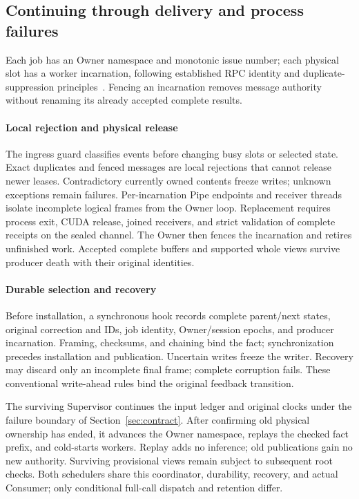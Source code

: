 \subsection{Continuing through delivery and process failures}
\label{subsec:native_resilience}
Each job has an Owner namespace and monotonic issue number; each physical
slot has a worker incarnation, following established RPC identity and
duplicate-suppression principles~\cite{birrell1984rpc}.
Fencing an incarnation removes message
authority without renaming its already accepted complete results.

\paragraph{Local rejection and physical release}
The ingress guard classifies events before changing busy slots or selected
state. Exact duplicates and fenced messages are local rejections that
cannot release newer leases. Contradictory currently owned contents freeze
writes; unknown exceptions remain failures. Per-incarnation Pipe endpoints
and receiver threads isolate incomplete logical frames from the Owner
loop. Replacement requires process exit, CUDA release, joined receivers,
and strict validation of complete receipts on the sealed channel. The
Owner then fences the incarnation and retires unfinished work. Accepted
complete buffers and supported whole views survive producer death with
their original identities.

\paragraph{Durable selection and recovery}
Before installation, a synchronous hook records complete parent/next
states, original correction and IDs, job identity, Owner/session epochs,
and producer incarnation. Framing, checksums, and chaining bind the fact;
synchronization precedes installation and publication. Uncertain writes
freeze the writer. Recovery may discard only an incomplete final frame;
complete corruption fails. These conventional write-ahead rules
\cite{mohan1992aries} bind the original feedback transition.

The surviving Supervisor continues the input ledger and original clocks
under the failure boundary of Section~\ref{sec:contract}. After confirming
old physical ownership has ended, it advances the Owner namespace,
replays the checked fact prefix, and cold-starts workers. Replay adds no
inference; old publications gain no new authority. Surviving provisional
views remain subject to subsequent root checks. Both schedulers share
this coordinator, durability, recovery, and actual Consumer; only
conditional full-call dispatch and retention differ.

